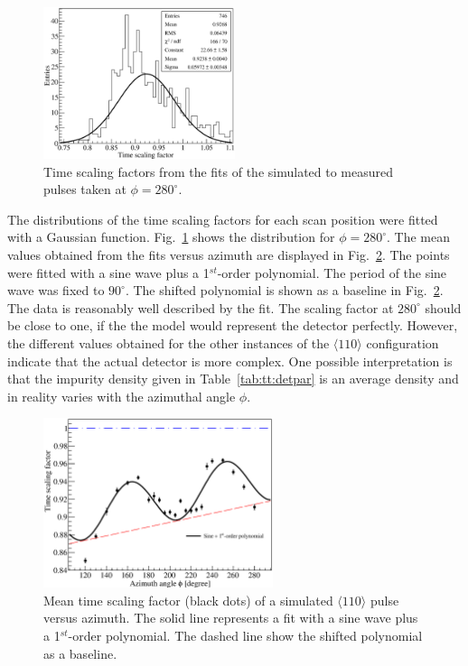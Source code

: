 \begin{figure}[htbp]
\centering
\includegraphics[width=0.5\textwidth]{tscale280}
\caption{Time scaling factors from the fits of the simulated to measured pulses taken at $\phi=280^{\circ}$.}
\label{fig:psa:ts280}
\end{figure}
The distributions of the time scaling factors for each scan position were fitted with a Gaussian function. Fig.~\ref{fig:psa:ts280} shows the distribution for $\phi = 280^{\circ}$. The mean values obtained from the fits versus azimuth are displayed in Fig.~\ref{fig:psa:tsc}. The points were fitted with a sine wave plus a 1$^{st}$-order polynomial. The period of the sine wave was fixed to $90^{\circ}$. The shifted polynomial is shown as a baseline in Fig.~\ref{fig:psa:tsc}. The data is reasonably well described by the fit. The scaling factor at $280^{\circ}$ should be close to one, if the the model would represent the detector perfectly. However, the different values obtained for the other instances of the $\langle 110 \rangle$ configuration indicate that the actual detector is more complex. One possible interpretation is that the impurity density given in Table~\ref{tab:tt:detpar} is an average density and in reality varies with the azimuthal angle $\phi$.

\begin{figure}[htbp]
\centering
\includegraphics[width=0.6\textwidth]{tsc}
\caption{Mean time scaling factor (black dots) of a simulated $\langle 110 \rangle$ pulse versus azimuth. The solid line represents a fit with a sine wave plus a 1$^{st}$-order polynomial. The dashed line show the shifted polynomial as a baseline.}
\label{fig:psa:tsc}
\end{figure}


